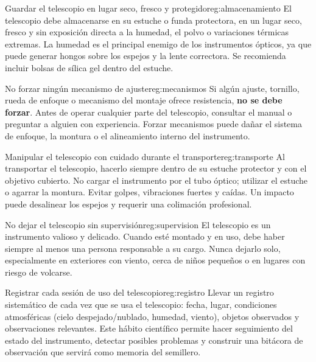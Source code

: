 \begin{regla}{Guardar el telescopio en lugar seco, fresco y protegido}{reg:almacenamiento}
    El telescopio debe almacenarse en su estuche o funda protectora, en un lugar
    seco, fresco y sin exposición directa a la humedad, el polvo o variaciones
    térmicas extremas. La humedad es el principal enemigo de los instrumentos
    ópticos, ya que puede generar hongos sobre los espejos y la lente correctora.
    Se recomienda incluir bolsas de sílica gel dentro del estuche.
\end{regla}

\begin{regla}{No forzar ningún mecanismo de ajuste}{reg:mecanismos}
    Si algún ajuste, tornillo, rueda de enfoque o mecanismo del montaje ofrece
    resistencia, \textbf{no se debe forzar}. Antes de operar cualquier parte del
    telescopio, consultar el manual o preguntar a alguien con experiencia.
    Forzar mecanismos puede dañar el sistema de enfoque, la montura o el alineamiento
    interno del instrumento.
\end{regla}

\begin{regla}{Manipular el telescopio con cuidado durante el transporte}{reg:transporte}
    Al transportar el telescopio, hacerlo siempre dentro de su estuche protector
    y con el objetivo cubierto. No cargar el instrumento por el tubo óptico;
    utilizar el estuche o agarrar la montura. Evitar golpes, vibraciones fuertes
    y caídas. Un impacto puede desalinear los espejos y requerir una colimación
    profesional.
\end{regla}

\begin{regla}{No dejar el telescopio sin supervisión}{reg:supervision}
    El telescopio es un instrumento valioso y delicado. Cuando esté montado
    y en uso, debe haber siempre al menos una persona responsable a su cargo.
    Nunca dejarlo solo, especialmente en exteriores con viento, cerca de niños
    pequeños o en lugares con riesgo de volcarse.
\end{regla}

\begin{regla}{Registrar cada sesión de uso del telescopio}{reg:registro}
    Llevar un registro sistemático de cada vez que se usa el telescopio: fecha,
    lugar, condiciones atmosféricas (cielo despejado/nublado, humedad, viento),
    objetos observados y observaciones relevantes. Este hábito científico permite
    hacer seguimiento del estado del instrumento, detectar posibles problemas y
    construir una bitácora de observación que servirá como memoria del semillero.
\end{regla}

